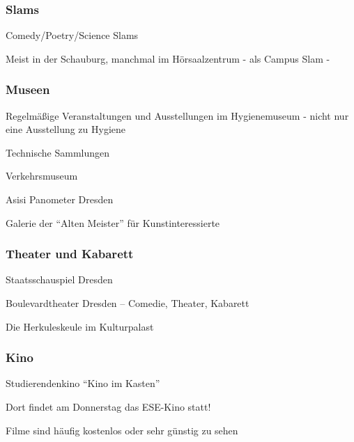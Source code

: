 \documentclass[a4paper,12pt]{scrreprt}
\begin{document}
\subsubsection{Slams}
\begin{itemize*}
    \item Comedy/Poetry/Science Slams
    \item Meist in der Schauburg, manchmal im Hörsaalzentrum - als Campus Slam -
\end{itemize*}

\subsubsection{Museen}
\begin{itemize*}
    \item Regelmäßige Veranstaltungen und Ausstellungen im Hygienemuseum - nicht nur eine Ausstellung zu Hygiene
    \item Technische Sammlungen
    \item Verkehrsmuseum
    \item Asisi Panometer Dresden
    \item Galerie der \enquote{Alten Meister} für Kunstinteressierte
\end{itemize*}

\subsubsection{Theater und Kabarett}
\begin{itemize*}
    \item Staatsschauspiel Dresden
    \item Boulevardtheater Dresden -- Comedie, Theater, Kabarett
    \item Die Herkuleskeule im Kulturpalast
\end{itemize*}

\subsubsection{Kino}
\begin{itemize*}
    \item Studierendenkino \enquote{Kino im Kasten}
    \item Dort findet am Donnerstag das ESE-Kino statt!
    \item Filme sind häufig kostenlos oder sehr günstig zu sehen
\end{itemize*}

\bigskip
\bigskip
\end{document}
